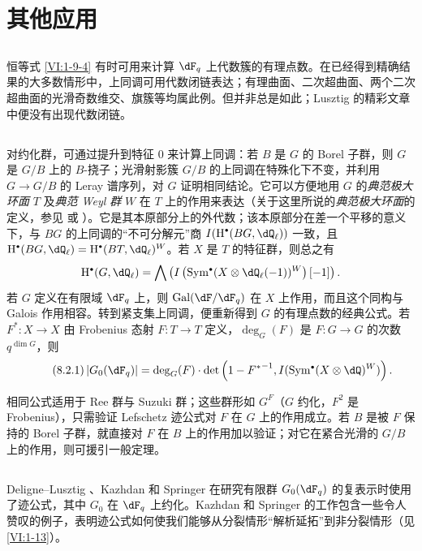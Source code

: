 \section{其他应用}\label{VI:8}

\subsection{}\label{VI:8-1}

恒等式 \ref{VI:1-9-4} 有时可用来计算 $\dF_q$ 上代数簇的有理点数。在已经得到精确结果的大多数情形中，上同调可用代数闭链表达；有理曲面、二次超曲面、两个二次超曲面的光滑奇数维交、旗簇等均属此例。但并非总是如此；Lusztig 的精彩文章 \cite{lu76} 中便没有出现代数闭链。

\subsection{}\label{VI:8-2}

对约化群，可通过提升到特征 $0$ 来计算上同调：若 $B$ 是 $G$ 的 Borel 子群，则 $G$ 是 $G/B$ 上的 $B$-挠子；光滑射影簇 $G/B$ 的上同调在特殊化下不变，并利用 $G\to G/B$ 的 Leray 谱序列，对 $G$ 证明相同结论。它可以方便地用 $G$ 的\emph{典范极大环面} $T$ 及\emph{典范 Weyl 群} $W$ 在 $T$ 上的作用来表达（关于这里所说的\emph{典范极大环面}的定义，参见 \cite[VIII \S 5 Rem.2]{bo05} 或 \cite[p.105]{dl76}）。它是其本原部分上的外代数；该本原部分在差一个平移的意义下，与 $B G$ 的上同调的“不可分解元”商 $I(\h^\bullet(B G,\dQ_\ell))$ 一致，且 $\h^\bullet(B G,\dQ_\ell)=\h^\bullet(B T,\dQ_\ell)^W$。若 $X$ 是 $T$ 的特征群，则总之有
\[
  \h^\bullet(G,\dQ_\ell) = \bigwedge \left(I\left(\operatorname{Sym}^\bullet(X\otimes \dQ_\ell(-1))^W\right)[-1]\right) \text{.}
\]
若 $G$ 定义在有限域 $\dF_q$ 上，则 $\gal(\dF/\dF_q)$ 在 $X$ 上作用，而且这个同构与 Galois 作用相容。转到紧支集上同调，便重新得到 $G$ 的有理点数的经典公式。若 $F^\ast:X\to X$ 由 Frobenius 态射 $F:T\to T$ 定义，$\deg_G(F)$ 是 $F:G\to G$ 的次数 $q^{\dim G}$，则
\begin{equation*}\tag{8.2.1}\label{VI:eq:8-2-1}
  \left|G_0(\dF_q)\right| = \deg_G(F) \cdot \det\left(1-{F^\ast}^{-1},I(\operatorname{Sym}^\bullet(X\otimes \dQ)^W)\right) \text{.}
\end{equation*}

相同公式适用于 Ree 群与 Suzuki 群；这些群形如 $G^F$（$G$ 约化，$F^2$ 是 Frobenius），只需验证 Lefschetz 迹公式对 $F$ 在 $G$ 上的作用成立。若 $B$ 是被 $F$ 保持的 Borel 子群，就直接对 $F$ 在 $B$ 上的作用加以验证；对它在紧合光滑的 $G/B$ 上的作用，则可援引一般定理。

\subsection{}\label{VI:8-3}

Deligne--Lusztig \cite{dl76}、Kazhdan \cite{ka77} 和 Springer \cite{sp76} 在研究有限群 $G_0(\dF_q)$ 的复表示时使用了迹公式，其中 $G_0$ 在 $\dF_q$ 上约化。Kazhdan 和 Springer 的工作包含一些令人赞叹的例子，表明迹公式如何使我们能够从分裂情形“解析延拓”到非分裂情形（见 \ref{VI:1-13}）。
